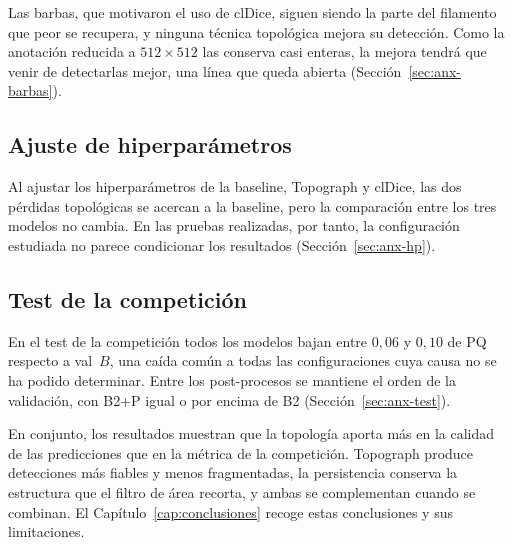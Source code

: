 Las barbas, que motivaron el uso de clDice, siguen siendo la parte del
filamento que peor se recupera, y ninguna técnica topológica mejora su
detección. Como la anotación reducida a $512\times512$ las conserva casi
enteras, la mejora tendrá que venir de detectarlas mejor, una línea que
queda abierta (Sección~\ref{sec:anx-barbas}).

\subsection{Ajuste de hiperparámetros}
\label{sec:res-hp}

Al ajustar los hiperparámetros de la baseline, Topograph y clDice, las
dos pérdidas topológicas se acercan a la baseline, pero la comparación
entre los tres modelos no cambia. En las pruebas realizadas, por tanto,
la configuración estudiada no parece condicionar los resultados
(Sección~\ref{sec:anx-hp}).

\subsection{Test de la competición}
\label{sec:res-test}

En el test de la competición todos los modelos bajan entre $0{,}06$ y
$0{,}10$ de PQ respecto a val~$B$, una caída común a todas las
configuraciones cuya causa no se ha podido determinar. Entre los
post-procesos se mantiene el orden de la validación, con B2+P igual o
por encima de B2 (Sección~\ref{sec:anx-test}).

En conjunto, los resultados muestran que la topología aporta más en la
calidad de las predicciones que en la métrica de la competición.
Topograph produce detecciones más fiables y menos fragmentadas, la
persistencia conserva la estructura que el filtro de área recorta, y
ambas se complementan cuando se combinan. El
Capítulo~\ref{cap:conclusiones} recoge estas conclusiones y sus
limitaciones.
